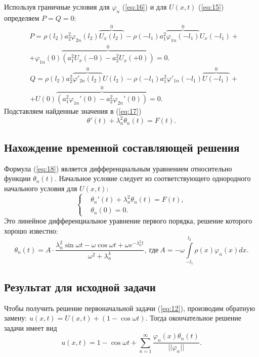 \documentclass[12pt, a4paper]{article}
\begin{document}
Используя граничные условия для $\varphi_n$ (\ref{eq:16}) и для $U(x,t)$ (\ref{eq:15}) определяем $P=Q=0$:
\begin{equation}
  \begin{aligned}
  & P = \rho(l_2) a_2^2 \varphi_{2n}(l_2) \overbrace{U_x(l_2)}^0 - \rho(-l_1) a_1^2 \overbrace{\varphi_{1n}(-l_1)}^0 U_x(-l_1) + \\
  & + \varphi_{1n}(0)\overbrace{(a_1^2 U_x(-0) - a_2^2 U_x(+0))}^0 = 0.
\end{aligned}
\end{equation}
\begin{equation}
  \begin{aligned}
    & Q = \rho(l_2) a_2^2 \overbrace{\varphi'_{2n}(l_2)}^0 U(l_2) - \rho(-l_1) a_1^2 \varphi'_{1n}(-l_1) \overbrace{U(-l_1)}^0 + \\
    & + U(0)\overbrace{(a_1^2 \varphi_{1n}'(0) - a_2^2 \varphi_{2n}'(0))}^0 = 0.
\end{aligned}
\end{equation}
Подставляем найденные значения в (\ref{eq:17})
\begin{equation}
\theta'(t) + \lambda_n^2 \theta_n(t) = F(t).
\label{eq:18}
\end{equation}
\subsection{Нахождение временной составляющей решения}
Формула (\ref{eq:18}) является дифференциальным уравнением относительно функции $\theta_n(t)$. Начальное условие следует из соответствующего однородного начального условия для $U(x,t)$:
\begin{equation}
  \left\{  
  \begin{aligned}
    & \theta_n'(t) + \lambda_n^2 \theta_n(t) = F(t), \\
    & \theta_n (0) = 0.
  \end{aligned}
  \right.
\end{equation}
Это линейное дифференциальное уравнение первого порядка, решение которого хорошо известно:
\begin{equation}
  \theta_n(t) = A\cdot\frac{\lambda_n^2 \sin \omega t - \omega \cos \omega t + \omega e^{-\lambda_n^2 t}}{\omega^2 + \lambda_n^4},\ \text{где}\ A=-\omega\int\limits_{-l_1}^{l_2}\rho(x)\varphi_n(x)dx.
\end{equation}
\subsection{Результат для исходной задачи}
Чтобы получить решение первоначальной задачи (\ref{eq:12}), производим обратную замену: $u(x,t) = U(x,t) + (1 - \cos \omega t)$. Тогда окончательное решение задачи имеет вид
\begin{equation}
  u(x,t)= 1 - \cos \omega t + \sum \limits_{n=1}^{\infty} \frac{\varphi_n(x) \theta_n(t)}{||\varphi_n||}.
\end{equation}
\end{document}
